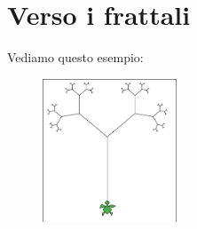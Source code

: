 \section{Verso i frattali}

Vediamo questo esempio:

\vskip 1cm

\begin{minipage}{0.5\textwidth}
\begin{figure}[H]
   \includegraphics[width=4.0cm,trim=4 4 8 4,clip]{./images/magia-specchi/tree.png}
   \label{tree-1}
\end{figure}
\end{minipage} \hfill
